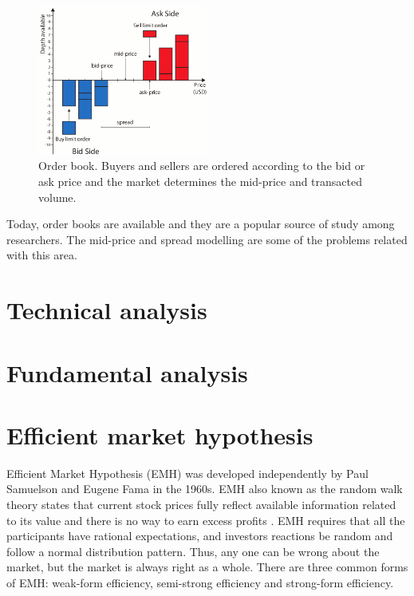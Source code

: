 \begin{figure}[!h]
  \centering
  \includegraphics[width=0.5\textwidth]{img/orderbook}
  \caption{Order book. Buyers and sellers are ordered according to the bid or
  ask price and the market determines the mid-price and transacted volume.}
  \label{fig:orderbook}
\end{figure}
Today, order books are available and they are a popular source of study among
researchers. The mid-price and spread modelling are some of the
problems related with this area. 

\section{Technical analysis}

\section{Fundamental analysis}


\section{Efficient market hypothesis}

Efficient Market Hypothesis (EMH) was developed independently by  Paul Samuelson and Eugene Fama in the 1960s.
EMH also known as the random walk theory states that current stock prices fully reflect available information related to its value and there is no way to earn excess profits
\cite{fama1970}. EMH requires that all the participants have rational expectations, and investors reactions be random and follow a normal distribution pattern. Thus, any one can be wrong about the market, but the market is always right as a whole.
There are three common forms of EMH: weak-form efficiency, semi-strong efficiency and strong-form efficiency.

